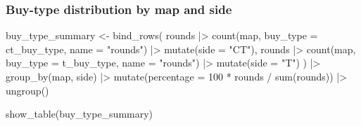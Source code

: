 \documentclass[
  letterpaper,
  DIV=11,
  numbers=noendperiod]{scrartcl}
\newenvironment{Shaded}{\begin{snugshade}}{\end{snugshade}}
\newcommand{\AttributeTok}[1]{\textcolor[rgb]{0.40,0.45,0.13}{#1}}
\newcommand{\DecValTok}[1]{\textcolor[rgb]{0.68,0.00,0.00}{#1}}
\newcommand{\FunctionTok}[1]{\textcolor[rgb]{0.28,0.35,0.67}{#1}}
\newcommand{\NormalTok}[1]{\textcolor[rgb]{0.00,0.23,0.31}{#1}}
\newcommand{\OtherTok}[1]{\textcolor[rgb]{0.00,0.23,0.31}{#1}}
\newcommand{\SpecialCharTok}[1]{\textcolor[rgb]{0.37,0.37,0.37}{#1}}
\newcommand{\StringTok}[1]{\textcolor[rgb]{0.13,0.47,0.30}{#1}}
\begin{document}
\subsubsection{Buy-type distribution by map and
side}\label{buy-type-distribution-by-map-and-side}

\begin{Shaded}
\begin{Highlighting}[]
\NormalTok{buy\_type\_summary }\OtherTok{\textless{}{-}} \FunctionTok{bind\_rows}\NormalTok{(}
\NormalTok{  rounds }\SpecialCharTok{|\textgreater{}} \FunctionTok{count}\NormalTok{(map, }\AttributeTok{buy\_type =}\NormalTok{ ct\_buy\_type, }\AttributeTok{name =} \StringTok{"rounds"}\NormalTok{) }\SpecialCharTok{|\textgreater{}}
    \FunctionTok{mutate}\NormalTok{(}\AttributeTok{side =} \StringTok{"CT"}\NormalTok{),}
\NormalTok{  rounds }\SpecialCharTok{|\textgreater{}} \FunctionTok{count}\NormalTok{(map, }\AttributeTok{buy\_type =}\NormalTok{ t\_buy\_type, }\AttributeTok{name =} \StringTok{"rounds"}\NormalTok{) }\SpecialCharTok{|\textgreater{}}
    \FunctionTok{mutate}\NormalTok{(}\AttributeTok{side =} \StringTok{"T"}\NormalTok{)}
\NormalTok{) }\SpecialCharTok{|\textgreater{}}
  \FunctionTok{group\_by}\NormalTok{(map, side) }\SpecialCharTok{|\textgreater{}}
  \FunctionTok{mutate}\NormalTok{(}\AttributeTok{percentage =} \DecValTok{100} \SpecialCharTok{*}\NormalTok{ rounds }\SpecialCharTok{/} \FunctionTok{sum}\NormalTok{(rounds)) }\SpecialCharTok{|\textgreater{}}
  \FunctionTok{ungroup}\NormalTok{()}

\FunctionTok{show\_table}\NormalTok{(buy\_type\_summary)}
\end{Highlighting}
\end{Shaded}
\end{document}

